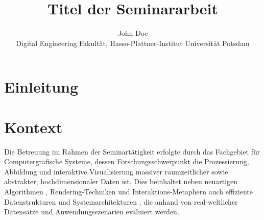 \documentclass[german]{cgspaper} %
\title{Titel der Seminararbeit}
\author{John Doe\\ Digital Engineering Fakultät, Hasso-Plattner-Institut \textbar{} Universität Potsdam}
\begin{document}

\maketitle

\begin{abstract}
\end{abstract}

\copyrightspace %

\section{Einleitung}


\section{Kontext}
\label{sec:Kontext}
Die Betreuung im Rahmen der Seminartätigkeit erfolgte durch das Fachgebiet für Computergrafische Systeme, dessen Forschungsschwerpunkt die Prozessierung, Abbildung und interaktive Visualisierung massiver raumzeitlicher \cite{Oehlke2015,Buschmann2015,Buschmann2014,Maass2006} sowie abstrakter, hochdimensionaler Daten \cite{Limberger2017,Limberger2016,Wuerfel2015} ist. Dies beinhaltet neben neuartigen Algorithmen \cite{RichterKyprianidis2013,RichterBehrens2013,Glander2012}, Rendering-Techniken \cite{Semmo2016,Pasewaldt2014,Maass2006a,Doellner2005} und Interaktions-Metaphern \cite{Semmo2016a,Scheibel2016,Semmo2014} auch effiziente Datenstrukturen \cite{Scheibel2017,Richter2015} und Systemarchitekturen \cite{Klimke2014,Trapp2012,Klimke2010}, die anhand von real-weltlicher Datensätze und Anwendungsszenarien  \cite{Discher2016,Trapp2015,Engel2012} evaluiert werden. 
\end{document}
